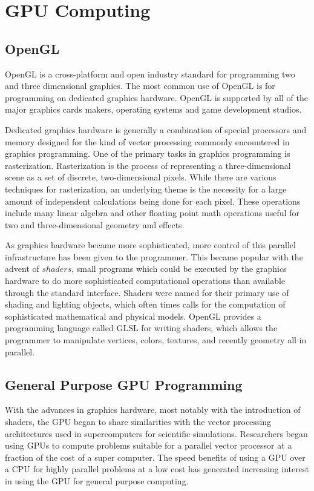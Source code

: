 \chapter{GPU Computing}

\section{OpenGL}
OpenGL is a cross-platform and open industry standard for programming two and
three dimensional graphics.\cite{OpenGL} The most common use of OpenGL is for programming on
dedicated graphics hardware. OpenGL is supported by all of the major graphics
cards makers, operating systems and game development studios.


Dedicated graphics hardware is generally a combination of special processors
and memory designed for the kind of vector processing commonly encountered in
graphics programming. One of the primary tasks in graphics programming is
rasterization. Rasterization is the process of representing a three-dimensional
scene as a set of discrete, two-dimensional pixels. While there are various
techniques for rasterization, an underlying theme is the necessity for a large
amount of independent calculations being done for each pixel. These operations
include many linear algebra and other floating point math operations useful for
two and three-dimensional geometry and effects.\cite{Luebke2007}


As graphics hardware became more sophisticated, more control of this parallel
infrastructure has been given to the programmer. This became popular with the
advent of $shaders$, small programs which could be executed by the graphics
hardware to do more sophisticated computational operations than available
through the standard interface. Shaders were named for their primary use of
shading and lighting objects, which often times calls for the computation of
sophisticated mathematical and physical models. OpenGL provides a programming
language called GLSL for writing shaders, which allows the programmer to
manipulate vertices, colors, textures, and recently geometry all in parallel.\cite{Luebke2007}


\section{General Purpose GPU Programming}


With the advances in graphics hardware, most notably with the introduction of
shaders, the GPU began to share similarities with the vector processing
architectures used in supercomputers for scientific simulations. Researchers
began using GPUs to compute problems suitable for a parallel vector processor
at a fraction of the cost of a super computer. The speed benefits of using a
GPU over a CPU for highly parallel problems at a low cost has generated
increasing interest in using the GPU for general purpose computing.\cite{Owens2007}


